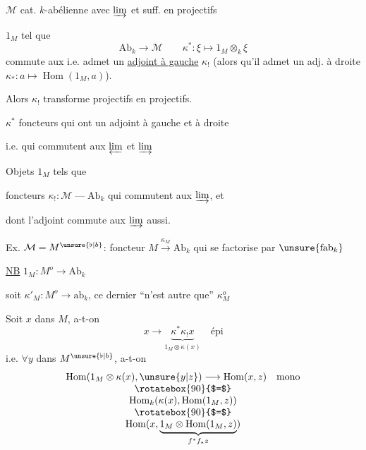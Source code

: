 $\mathcal M$ \deleted{$\unsure{\xi}$} cat. $k$-abélienne avec
 $\varinjlim$ et suff. en projectifs

$1_M$ tel que
\[
\mathrm{Ab}_k\longrightarrow\mathcal M\qquad
\kappa^*: \xi\longmapsto1_M\otimes_k\xi
\]
commute aux  \inserted{$\varprojlim$}
i.e. admet un \uline{adjoint à gauche} $\kappa_!$
(alors qu'il admet un adj. à droite
$\kappa_*:a\longmapsto\operatorname{Hom}(1_M,a)$).

Alors $\kappa_!$ transforme projectifs en projectifs.


$\kappa^*$ foncteurs 
qui ont un adjoint à gauche et à droite

i.e. qui 
commutent aux $\varprojlim$ et $\varinjlim$

Objets $1_M$ tels que

foncteurs $\kappa_!:\mathcal M\mathbin{\text{---}}\mathrm{Ab}_k$
qui commutent aux $\varinjlim$, et

dont l'adjoint  commute aux $\varinjlim$ aussi.

Ex. $\mathcal M=M^{\unsure{\flat|b}}$:
foncteur $M\xrightarrow{\kappa_M}\mathrm{Ab}_k$ qui se factorise par
$\unsure{\mathrm{fab}_k}$

\uline{NB} $1_M:M^o\longrightarrow\mathrm{Ab}_k$

soit $\kappa'_M:M^o\longrightarrow\mathrm{ab}_k$,
ce dernier ``n'est autre que'' $\kappa_M^o$

Soit $x$ dans $M$, a-t-on
\[
x\longrightarrow\underbrace{\kappa^*\kappa_!x}_{1_M\otimes\kappa(x)}
\quad\text{épi}
\]
i.e. $\forall y$ dans $M^{\unsure{\flat|b}}$, a-t-on
\[
\begin{array}{c}
\operatorname{Hom}(1_M\otimes\kappa(x),\unsure{y|z})
\longrightarrow\operatorname{Hom}(x,z)\quad\text{mono}\\
\rotatebox{90}{$=$}\\
\operatorname{Hom}_k(\kappa(x),\operatorname{Hom}(1_M,z))\\
\rotatebox{90}{$=$}\\
\operatorname{Hom}(x,\underbrace{1_M\otimes\operatorname{Hom}(1_M,z)}_{f^*f_*z})
\end{array}
\]

